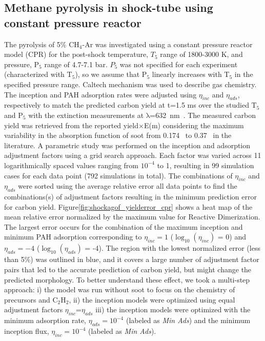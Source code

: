 \subsection{Methane pyrolysis in shock-tube using constant pressure reactor}
The pyrolysis of 5\% $\mathrm{CH_4}$-Ar was investigated using a constant pressure reactor model (CPR) for the post-shock temperature, $T_5$ range of 1800-3000 K, and pressure, $\mathrm{P_5}$ range of 4.7-7.1 bar. $P_5$ was not specified for each experiment (characterized with $\mathrm{T_5}$), so we assume that $\mathrm{P_5}$ linearly increases with $\mathrm{T_5}$ in the specified pressure range. Caltech mechanism was used to describe gas chemistry. The inception and PAH adsorption rates were adjusted using $\eta_{inc}$ and $\eta_{ads}$, respectively to match the predicted carbon yield at t=1.5 ms over the studied $\mathrm{T_5}$ and $\mathrm{P_5}$ with the extinction measurements at $\mathrm{\lambda}$=632~nm~\citep{agafonov2016unified}. The measured carbon yield was retrieved from the reported yield$\times$E(m) considering the maximum variability in the absorption function of soot from 0.174~\citep{lee1981optical} to 0.37~\citep{agafonov2011soot} in the literature. A parametric study was performed on the inception and adsorption adjustment factors using a grid search approach. Each factor was varied across 11 logarithmically spaced values ranging from $10^{-4}$ to 1, resulting in 99 simulation cases for each data point (792 simulations in total). The combinations of $\eta_{inc}$ and $\eta_{ads}$ were sorted using the average relative error all data points to find the combinations(s) of adjustment factors resulting in the minimum prediction error for carbon yield. Figure\ref{fig:shockagof_yielderror_cpr} shows a heat map of the mean relative error normalized by the maximum value for Reactive Dimerization. The largest error occurs for the combination of the maximum inception and minimum PAH adsorption corresponding to  $\eta_{inc}=1$ ($\mathrm{\log_{10}}(\eta_{inc})$ = 0) and $\eta_{ads}=-4$ ($\mathrm{\log_{10}}(\eta_{ads})$ = -4). The region with the lowest normalized error (less than 5\%) was outlined in blue, and it covers a large number of adjustment factor pairs that led to the accurate prediction of carbon yield, but might change the predicted morphology. To better understand these effect, we took a multi-step approach: i) the model was run without soot to focus on the chemistry of precursors and $\mathrm{C_2H_2}$, ii) the inception models were optimized using equal adjustment factors $\eta_{inc}$=$\eta_{ads}$ iii) the inception models were optimized with the minimum adsorption rate, $\eta_{ads}= 10^{-4}$ (labeled as \textit{Min Ads}) and the minimum inception flux, $\eta_{inc}= 10^{-4}$ (labeled as \textit{Min Ads}).

